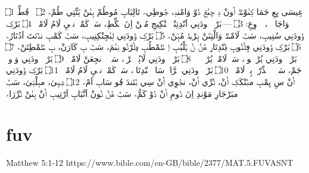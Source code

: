 \documentclass[12pt,fleqn,titlepage,twoside,a4paper]{book}
\begin{document}
\begin{arab}[utf]

\section*{}

۝1 عِيسَى يِعِ جَمَا کٜىٰوْطٝ اٝونْ دٜ ڃٜىٰݝِ دٝوْ وَامْندٜ، جٝوطِي؞ تَالِبَاٻٜ مُوطُمْ ٻٜىٰنْ ٻَتِّتِي طُمْ؞ ۝2 اٝ ڢُطِّ وَاجَادٜ ٻٜ، اٝ وِعِ:
۝3 — بَرْکٜ وٝودَنِي اَنّدِتِنْٻٜ يٝنْکِيجِ مُٻّٜنْ اِنَ لٝکِّطِ،
سَبٝ کَمْٻٜ نجٜيِ لَامُ لَامْطٝ؞
۝4	بَرْکٜ وٝودَنِي سُنِيٻٜ،
سَبٝ لَامْطٝ وَالْتِنَنْ ٻٜرْطٜ مُٻّٜنْ؞
۝5	بَرْکٜ وٝودَنِي لٜىٰڃِنْکِنِيٻٜ،
سَبٝ کَمْٻٜ ندٝنَتَ اَدُنَارُ؞
۝6	بَرْکٜ وٝودَنِي ڢِلٝتٝوٻٜ ڢٝنّدِتَارٜ هٝنٝ نٝ يٝلْبُٻٜ اٜ طٝمْطُٻٜ ݠِلٝرْتٝو نٜىٰمَ،
سَبٝ ٻٜ کَارَنْ، ٻٜ طٝمْطِتَنْ؞
۝7	بَرْکٜ وٝودَنِي يُرْمٝتٝوٻٜ،
سَبٝ لَامْطٝ يُرْمٝتٝ ٻٜ؞
۝8	بَرْکٜ وٝودَنِي لَاٻُٻٜ ٻٜرْطٜ،
سَبٝ ٻٜ نجِعَنْ لَامْطٝ؞
۝9	بَرْکٜ وٝودَنِي وَدّٝوٻٜ جَمْ،
سَبٝ ٻٜ نٝدِّرْتٜ ٻِٻّٜ لَامْطٝ؞
۝10	بَرْکٜ وٝودَنِي تٝرَّاٻٜ سَابٜ ڢٝنّدِتَارٜ،
سَبٝ کَمْٻٜ نجٜيِ لَامُ لَامْطٝ؞
۝11 بَرْکٜ وٝودَنِي اٝنْ سِ يِمْٻٜ مبٝنْکَکٜ اٝنْ، تٝرِّي اٝنْ، نجٝوِي اٝنْ سِي بٝنَندَ ڢُو سَابٜ اَمْ؞ ۝12 شٜيٜىٰ، مبٜلْتٜىٰ، سَبٝ مبَرْجَارِ مَوْندِ اِنَ دٝومِ اٝنْ دٝوْ کَمُّ؞ سَبٝ هٝنٝ نٝونْ اَنَّبَاٻٜ اَرْتِيٻٜ اٝنْ ٻٜىٰنْ تٝرِّرَا؞


\end{arab}


\section{fuv}

Matthew 5:1-12 https://www.bible.com/en-GB/bible/2377/MAT.5.FUVASNT
\end{document}
